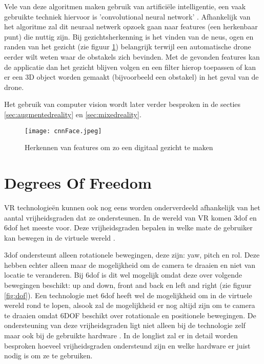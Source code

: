 Vele van deze algoritmen maken gebruik van artificiële intelligentie, een vaak gebruikte techniek hiervoor is 'convolutional neural network' \autocite{Ji2013}. Afhankelijk van het algoritme zal dit neuraal netwerk opzoek gaan naar features (een herkenbaar punt) die nuttig zijn. Bij gezichtsherkenning is het vinden van de neus, ogen en randen van het gezicht (zie figuur \ref{fig:cnnface}) belangrijk terwijl een automatische drone eerder wilt weten waar de obstakels zich bevinden. Met de gevonden features kan de applicatie dan het gezicht blijven volgen en een filter hierop toepassen of kan er een 3D object worden gemaakt (bijvoorbeeld een obstakel) in het geval van de drone. 

Het gebruik van computer vision wordt later verder besproken in de secties \ref{sec:augmentedreality} en \ref{sec:mixedreality}.

\begin{figure}
    \texttt{[image: cnnFace.jpeg]}
    \caption{Herkennen van features om zo een digitaal gezicht te maken \autocite{Murray2017}}
    \label{fig:cnnface}
\end{figure}

\section{Degrees Of Freedom}

VR technologieën kunnen ook nog eens worden onderverdeeld afhankelijk van het aantal vrijheidsgraden dat ze ondersteunen. In de wereld van VR komen \acrshort{3dof} en \acrshort{6dof} het meeste voor. Deze vrijheidsgraden bepalen in welke mate de gebruiker kan bewegen in de virtuele wereld \autocite{Chen1995}.

\acrshort{3dof} ondersteunt alleen rotationele bewegingen, deze zijn: yaw, pitch en rol. Deze hebben echter alleen maar de mogelijkheid om de camera te draaien en niet van locatie te veranderen. Bij \acrshort{6dof} is dit wel mogelijk omdat deze over volgende bewegingen beschikt: up and down, front and back en left and right (zie figuur \ref{fig:dof}).
Een technologie met \acrshort{6dof} heeft wel de mogelijkheid om in de virtuele wereld rond te lopen, alsook zal de mogelijkheid er nog altijd zijn om te camera te draaien omdat 6DOF beschikt over rotationale en positionele bewegingen. De ondersteuning van deze vrijheidsgraden ligt niet alleen bij de technologie zelf maar ook bij de gebruikte hardware \autocite{Chen1995}. In de longlist zal er in detail worden besproken hoeveel vrijheidsgraden ondersteund zijn en welke hardware er juist nodig is om ze te gebruiken.

